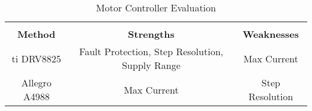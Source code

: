 \begin{table}[ht]
	\caption{Motor Controller Evaluation}
	\label{table:MCEval}
	\centering
	\begin{tabular}{c c c}
	\hline \hline \\
		\textbf{Method} & \textbf{Strengths} & \textbf{Weaknesses}\\
		\gls{ti} DRV8825 & Fault Protection, Step Resolution, Supply Range & Max Current\\
		Allegro A4988 & Max Current & Step Resolution\\
	\end{tabular}
\end{table}